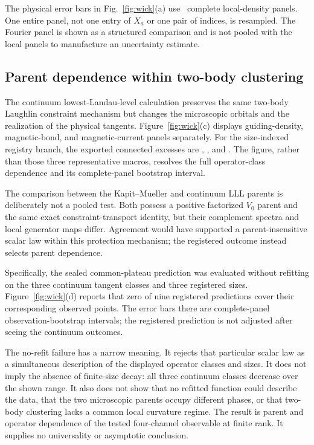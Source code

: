 The physical error bars in Fig.~\ref{fig:wick}(a) use
\RawMomentResidualRealizationCount\ complete local-density panels.  One entire panel,
not one entry of $X_a$ or one pair of indices, is resampled.  The Fourier
panel is shown as a structured comparison and is not pooled with the local
panels to manufacture an uncertainty estimate.

\subsection{Parent dependence within two-body clustering}

The continuum lowest-Landau-level calculation preserves the same two-body
Laughlin constraint mechanism but changes the microscopic orbitals and the
realization of the physical tangents.  Figure~\ref{fig:wick}(c) displays
guiding-density, magnetic-bond, and magnetic-current panels separately.  For
the size-indexed registry branch, the exported connected excesses are
\ContinuumLaughlinNThreeConnectedExcess,
\ContinuumLaughlinNFourConnectedExcess, and
\ContinuumLaughlinNFiveConnectedExcess.  The figure, rather than those three
representative macros, resolves the full operator-class dependence and its
complete-panel bootstrap interval.

The comparison between the Kapit--Mueller and continuum LLL parents is
deliberately not a pooled test.  Both possess a positive factorized
$V_0$ parent and the same exact constraint-transport identity, but their
complement spectra and local generator maps differ.  Agreement would have
supported a parent-insensitive scalar law within this protection mechanism;
the registered outcome instead selects parent dependence.

Specifically, the sealed common-plateau prediction was evaluated without
refitting on the three continuum tangent classes and three registered sizes.
Figure~\ref{fig:wick}(d) reports that zero of nine registered predictions
cover their corresponding observed points.  The error bars there are
complete-panel observation-bootstrap intervals; the registered prediction is
not adjusted after seeing the continuum outcomes.

The no-refit failure has a narrow meaning.  It rejects that particular scalar
law as a simultaneous description of the displayed operator classes and
sizes.  It does not imply the absence of finite-size decay: all three
continuum classes decrease over the shown range.  It also does not show that
no refitted function could describe the data, that the two microscopic
parents occupy different phases, or that two-body clustering lacks a common
local curvature regime.  The result is parent and operator dependence of the
tested four-channel observable at finite rank.  It supplies no universality
or asymptotic conclusion.
